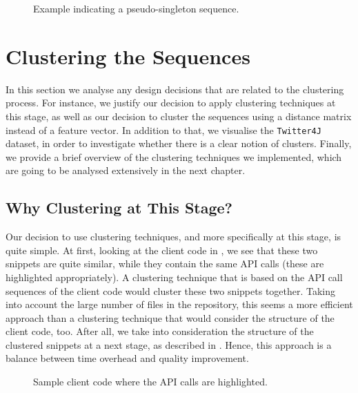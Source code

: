 \begin{figure}[ht]
\vspace{-10pt}

\vspace{-10pt}
\caption[Example indicating a pseudo-singleton sequence]{Example indicating a pseudo-singleton sequence.}
\label{listings:identical}
\vspace{-5pt}
\end{figure}


\section{Clustering the Sequences}
\label{sec:clustering-step}

In this section we analyse any design decisions that are related to the clustering process. For instance, we justify our decision to apply clustering techniques at this stage, as well as our decision to cluster the sequences using a distance matrix instead of a feature vector. In addition to that, we visualise the \texttt{Twitter4J} dataset, in order to investigate whether there is a clear notion of clusters. Finally, we provide a brief overview of the clustering techniques we implemented, which are going to be analysed extensively in the next chapter.


\subsection{Why Clustering at This Stage?}
\label{subsec:clustering-decision}

Our decision to use clustering techniques, and more specifically at this stage, is quite simple. At first, looking at the client code in , we see that these two snippets are quite similar, while they contain the same API calls (these are highlighted appropriately). A clustering technique that is based on the API call sequences of the client code would cluster these two snippets together. Taking into account the large number of files in the repository, this seems a more efficient approach than a clustering technique that would consider the structure of the client code, too. After all, we take into consideration the structure of the clustered snippets at a next stage, as described in . Hence, this approach is a balance between time overhead and quality improvement.

\begin{figure}[h]

\vspace{-10pt}
\caption[Sample client code 1]{Sample client code where the API calls are highlighted.}
\label{listings:cluster-snippet1}
\end{figure}

